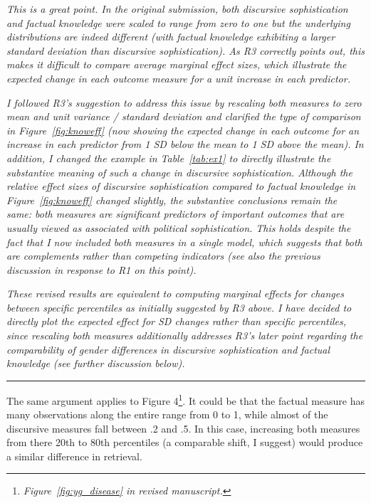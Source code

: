 \textit{This is a great point. In the original submission, both discursive sophistication and factual knowledge were scaled to range from zero to one but the underlying distributions are indeed different (with factual knowledge exhibiting a larger standard deviation than discursive sophistication). As R3 correctly points out, this makes it difficult to compare average marginal effect sizes, which illustrate the expected change in each outcome measure for a unit increase in each predictor.}

\textit{I followed R3's suggestion to address this issue by rescaling both measures to zero mean and unit variance / standard deviation and clarified the type of comparison in Figure~\ref{fig:knoweff} (now showing the expected change in each outcome for an increase in each predictor from 1 SD below the mean to 1 SD above the mean). In addition, I changed the example in Table~\ref{tab:ex1} to directly illustrate the substantive meaning of such a change in discursive sophistication. Although the relative effect sizes of discursive sophistication compared to factual knowledge in Figure~\ref{fig:knoweff} changed slightly, the substantive conclusions remain the same: both measures are significant predictors of important outcomes that are usually viewed as associated with political sophistication. This holds despite the fact that I now included both measures in a single model, which suggests that both are complements rather than competing indicators (see also the previous discussion in response to R1 on this point).}

\textit{These revised results are equivalent to computing marginal effects for changes between specific percentiles as initially suggested by R3 above. I have decided to directly plot the expected effect for SD changes rather than specific percentiles, since rescaling both measures additionally addresses R3's later point regarding the comparability of gender differences in discursive sophistication and factual knowledge (see further discussion below).}


\rule{\linewidth}{.01cm}

The same argument applies to Figure 4\footnote{\textit{Figure~\ref{fig:yg_disease} in revised manuscript.}}. It could be that the factual measure has many observations along the entire range from 0 to 1, while almost of the discursive measures fall between .2 and .5. In this case, increasing both measures from there 20th to 80th percentiles (a comparable shift, I suggest) would produce a similar difference in retrieval.

